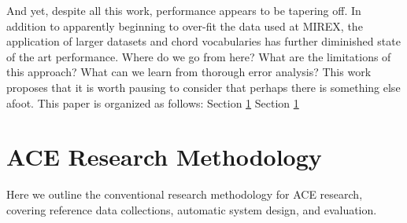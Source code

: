 \documentclass{article}
\begin{document}
And yet, despite all this work, performance appears to be tapering off.
In addition to apparently beginning to over-fit the data used at MIREX, the application of larger datasets and chord vocabularies has further diminished state of the art performance.
Where do we go from here?
What are the limitations of this approach?
What can we learn from thorough error analysis?
This work proposes that it is worth pausing to consider that perhaps there is something else afoot.
This paper is organized as follows:
Section \ref{}
Section \ref{}


\section{ACE Research Methodology}

Here we outline the conventional research methodology for ACE research, covering reference data collections, automatic system design, and evaluation.





\end{document}
